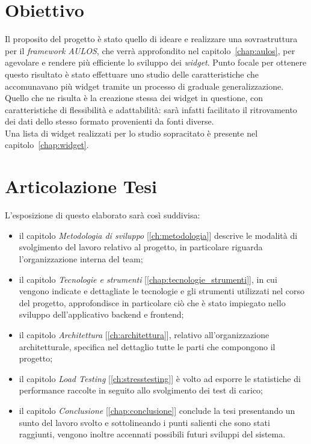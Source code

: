 \pagebreak
\section{Obiettivo}
Il proposito del progetto è stato quello di ideare e realizzare una sovrastruttura per il \textit{framework AULOS}, che verrà approfondito nel capitolo~\ref{chap:aulos}, per agevolare e rendere più efficiente lo sviluppo dei \textit{widget}. Punto focale per ottenere questo risultato è stato effettuare uno studio delle caratteristiche che accomunavano più widget tramite un processo di graduale generalizzazione.
Quello che ne risulta è la creazione stessa dei widget in questione, con caratteristiche di flessibilità e adattabilità: sarà infatti facilitato il ritrovamento dei dati dello stesso formato provenienti da fonti diverse. \\
Una lista di widget realizzati per lo studio sopracitato è presente nel capitolo~\ref{chap:widget}.

\section{Articolazione Tesi}
L'esposizione di questo elaborato sarà così suddivisa:
\begin{itemize}
    \item il capitolo \textit{Metodologia di sviluppo} [\ref{ch:metodologia}] descrive le modalità di svolgimento del lavoro relativo al progetto, in particolare riguarda l'organizzazione interna del team;
    \item il capitolo \textit{Tecnologie e strumenti} [\ref{chap:tecnologie_strumenti}], in cui vengono indicate e dettagliate le tecnologie e gli strumenti utilizzati nel corso del progetto, approfondisce in particolare ciò che è stato impiegato nello sviluppo dell'applicativo backend e frontend;
    \item il capitolo \textit{Architettura} [\ref{ch:architettura}], relativo all'organizzazione architetturale, specifica nel dettaglio tutte le parti che compongono il progetto;
    \item il capitolo \textit{Load Testing} [\ref{ch:stresstesting}] è volto ad esporre le statistiche di performance raccolte in seguito allo svolgimento dei test di carico;
    \item il capitolo \textit{Conclusione} [\ref{chap:conclusione}] conclude la tesi presentando un sunto del lavoro svolto e sottolineando i punti salienti che sono stati raggiunti, vengono inoltre accennati possibili futuri sviluppi del sistema.
\end{itemize}